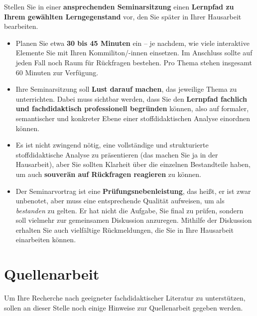 \documentclass[
]{scrbook}
\providecommand{\tightlist}{%
  \setlength{\itemsep}{0pt}\setlength{\parskip}{0pt}}
\theoremstyle{definition}
\theoremstyle{definition}
\theoremstyle{definition}
\theoremstyle{definition}
\theoremstyle{remark}
\begin{document}
Stellen Sie in einer \textbf{ansprechenden Seminarsitzung} einen \textbf{Lernpfad zu Ihrem gewählten Lerngegenstand} vor, den Sie später in Ihrer Hausarbeit bearbeiten.

\begin{itemize}
\tightlist
\item
  Planen Sie etwa \textbf{30 bis 45 Minuten} ein -- je nachdem, wie viele interaktive Elemente Sie mit Ihren Kommiliton/-innen einsetzen. Im Anschluss sollte auf jeden Fall noch Raum für Rückfragen bestehen. Pro Thema stehen insgesamt 60 Minuten zur Verfügung.
\item
  Ihre Seminarsitzung soll \textbf{Lust darauf machen}, das jeweilige Thema zu unterrichten. Dabei muss sichtbar werden, dass Sie den \textbf{Lernpfad fachlich und fachdidaktisch professionell begründen} können, also auf formaler, semantischer und konkreter Ebene einer stoffdidaktischen Analyse einordnen können.
\item
  Es ist nicht zwingend nötig, eine vollständige und strukturierte stoffdidaktische Analyse zu präsentieren (das machen Sie ja in der Hausarbeit), aber Sie sollten Klarheit über die einzelnen Bestandteile haben, um auch \textbf{souverän auf Rückfragen reagieren} zu können.
\item
  Der Seminarvortrag ist eine \textbf{Prüfungsnebenleistung}, das heißt, er ist zwar unbenotet, aber muss eine entsprechende Qualität aufweisen, um als \emph{bestanden} zu gelten. Er hat nicht die Aufgabe, Sie final zu prüfen, sondern soll vielmehr zur gemeinsamen Diskussion anzuregen. Mithilfe der Diskussion erhalten Sie auch vielfältige Rückmeldungen, die Sie in Ihre Hausarbeit einarbeiten können.
\end{itemize}

\hypertarget{quellenarbeit}{%
\section{Quellenarbeit}\label{quellenarbeit}}

Um Ihre Recherche nach geeigneter fachdidaktischer Literatur zu unterstützen, sollen an dieser Stelle noch einige Hinweise zur Quellenarbeit gegeben werden.
\end{document}
